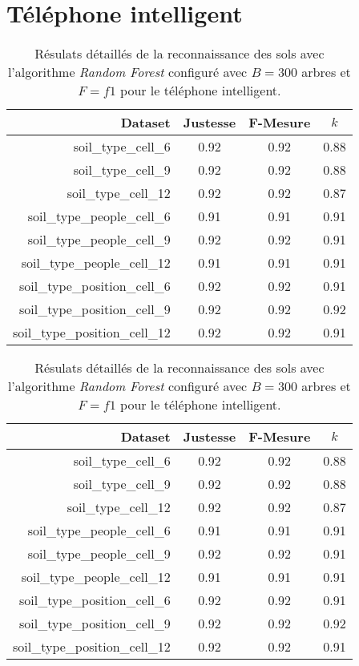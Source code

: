 \section{Téléphone intelligent}

\begin{table}[H]\renewcommand{\arraystretch}{0.5}
	\centering
	\caption{Résulats détaillés de la reconnaissance des sols avec l'algorithme \textit{Random Forest} configuré avec $B=300$ arbres et $F=f1$ pour le téléphone intelligent.}
	\label{tab:rf-300-cell}
	\begin{tabular}{@{}rccc@{}}
		\toprule
			\textbf{Dataset} & \textbf{Justesse} & \textbf{F-Mesure} & \textbf{$k$} \\
		\midrule
			soil\_type\_cell\_6 & 0.92 & 0.92 & 0.88 \\
			soil\_type\_cell\_9 & 0.92 & 0.92 & 0.88 \\
			soil\_type\_cell\_12 & 0.92 & 0.92 & 0.87 \\
			soil\_type\_people\_cell\_6 & 0.91 & 0.91 & 0.91 \\
			soil\_type\_people\_cell\_9 & 0.92 & 0.92 & 0.91 \\
			soil\_type\_people\_cell\_12 & 0.91 & 0.91 & 0.91 \\
			soil\_type\_position\_cell\_6 & 0.92 & 0.92 & 0.91 \\
			soil\_type\_position\_cell\_9 & 0.92 & 0.92 & 0.92 \\
			soil\_type\_position\_cell\_12 & 0.92 & 0.92 & 0.91 \\
		\bottomrule
	\end{tabular}
\end{table}

\begin{table}[H]\renewcommand{\arraystretch}{0.5}
	\centering
	\caption{Résulats détaillés de la reconnaissance des sols avec l'algorithme \textit{Random Forest} configuré avec $B=300$ arbres et $F=f1$ pour le téléphone intelligent.}
	\label{tab:rf-300-cell}
	\begin{tabular}{@{}rccc@{}}
		\toprule
			\textbf{Dataset} & \textbf{Justesse} & \textbf{F-Mesure} & \textbf{$k$} \\
		\midrule
			soil\_type\_cell\_6 & 0.92 & 0.92 & 0.88 \\
			soil\_type\_cell\_9 & 0.92 & 0.92 & 0.88 \\
			soil\_type\_cell\_12 & 0.92 & 0.92 & 0.87 \\
			soil\_type\_people\_cell\_6 & 0.91 & 0.91 & 0.91 \\
			soil\_type\_people\_cell\_9 & 0.92 & 0.92 & 0.91 \\
			soil\_type\_people\_cell\_12 & 0.91 & 0.91 & 0.91 \\
			soil\_type\_position\_cell\_6 & 0.92 & 0.92 & 0.91 \\
			soil\_type\_position\_cell\_9 & 0.92 & 0.92 & 0.92 \\
			soil\_type\_position\_cell\_12 & 0.92 & 0.92 & 0.91 \\
		\bottomrule
	\end{tabular}
\end{table}

